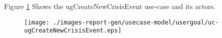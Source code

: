 Figure \ref{fig:lu.uni.lassy.excalibur.group09.spec-RE-UCD-uc-ugCreateNewCrisisEvent}
Shows the ugCreateNewCrisisEvent use-case and its actors.

\begin{figure}[htbp]
\begin{center}

\texttt{[image: ./images-report-gen/usecase-model/usergoal/uc-ugCreateNewCrisisEvent.eps]}
\end{center}
\caption[lu.uni.lassy.excalibur.group09.spec Use Case Diagram: uc-ugCreateNewCrisisEvent]{}
\label{fig:lu.uni.lassy.excalibur.group09.spec-RE-UCD-uc-ugCreateNewCrisisEvent}
\end{figure}
\vspace{0.5cm}
